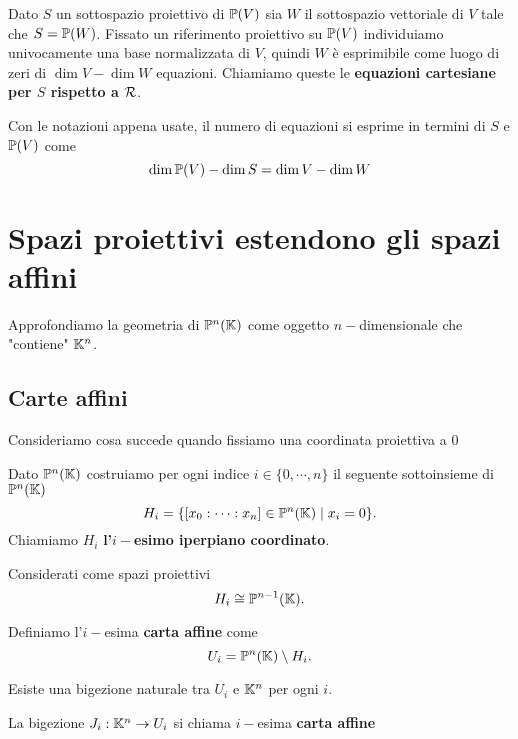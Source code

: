 \begin{multicols*}{2}
    \begin{definition}
    Dato $S$ un sottospazio proiettivo di ${\mathbb{P}(V)}$ sia $W$ il sottospazio vettoriale di $V$ tale che $S={\mathbb{P}(W)}$. Fissato un riferimento proiettivo su ${\mathbb{P}(V)}$ individuiamo univocamente una base normalizzata di $V$, quindi $W$ \`e esprimibile come luogo di zeri di $\dim V-\dim W$ equazioni. Chiamiamo queste le \textbf{equazioni cartesiane per $S$ rispetto a $\mathcal{R}$}.
    \end{definition}
    \begin{remark}
    Con le notazioni appena usate, il numero di equazioni si esprime in termini di $S$ e ${\mathbb{P}(V)}$ come
    \[\dim {\mathbb{P}(V)}-\dim S=\dim V-\dim W\]
    \end{remark}

    \section{Spazi proiettivi estendono gli spazi affini}
    Approfondiamo la geometria di $\mathbb{P}^n(\mathbb{K})$ come oggetto $n-$dimensionale che "contiene" $\mathbb{K}^n$.
    \subsection{Carte affini}
    Consideriamo cosa succede quando fissiamo una coordinata proiettiva a $0$

    \begin{definition}
    Dato $\mathbb{P}^n(\mathbb{K})$ costruiamo per ogni indice $i\in\{0,\cdots,n\}$ il seguente sottoinsieme di $\mathbb{P}^n(\mathbb{K})$
    \[H_i=\{[x_0:\cdots:x_n]\in\mathbb{P}^n(\mathbb{K})\mid x_i=0\}.\]
    Chiamiamo $H_i$ \textbf{l'$i-$esimo iperpiano coordinato}.
    \end{definition}
    \begin{remark}
    Considerati come spazi proiettivi
    \[H_i\cong\mathbb{P}^{n-1}(\mathbb{K}).\]
    \end{remark}

    \begin{definition}
    Definiamo l'$i-$esima \textbf{carta affine} come
    \[U_i=\mathbb{P}^n(\mathbb{K})\setminus H_i.\]
    \end{definition}
    \begin{proposition}
    Esiste una bigezione naturale tra $U_i$ e $\mathbb{K}^n$ per ogni $i$.
    \end{proposition}

    \begin{definition}
    La bigezione $J_i:\mathbb{K}^n\to U_i$ si chiama $i-$esima \textbf{carta affine}
    \end{definition}


\end{multicols*}

